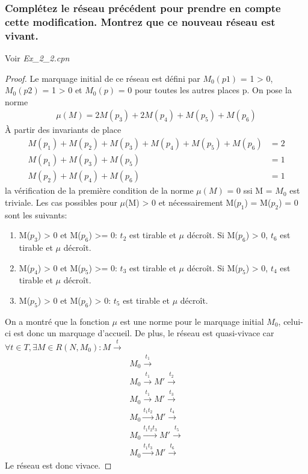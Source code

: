 \documentclass[french]{article}
\begin{document}
\subsubsection{Complétez le réseau précédent pour prendre en compte cette modification. Montrez que ce nouveau réseau est
  vivant.}
Voir \textit{Ex\_2\_2.cpn}
\begin{proof}
  Le marquage initial de ce réseau est défini par $M_0(p1)$ = 1 > 0, $M_0(p2)$ = 1 > 0 et $M_0(p)$ = 0 pour toutes les autres
  places p. On pose la norme
  \begin{align*}
    \mu(M) = 2M(p_3) + 2M(p_4) + M(p_5) + M(p_6)
  \end{align*}
  À partir des invariants de place
  \begin{align*}
    M(p_1) + M(p_2) + M(p_3) + M(p_4) + M(p_5) + M(p_6) &= 2 \\
    M(p_1) + M(p_3) + M(p_5) &= 1 \\
    M(p_2) + M(p_4) + M(p_6) &= 1
  \end{align*}
  la vérification de la première condition de la norme $\mu(M)$ = 0 ssi M = $M_0$ est triviale. Les cas possibles pour
  $\mu$(M) > 0 et nécessairement M($p_1$) = M($p_2$) = 0 sont les
  suivants:
  \begin{enumerate}
  \item M($p_3$) > 0 et M($p_6$) >= 0: $t_2$ est tirable et $\mu$ décroît. Si M($p_6$) > 0, $t_6$ est tirable et $\mu$ décroît.
  \item M($p_4$) > 0 et M($p_5$) >= 0: $t_3$ est tirable et $\mu$ décroît. Si M($p_5$) > 0, $t_4$ est tirable et $\mu$ décroît.
  \item M($p_5$) > 0 et M($p_6$) > 0: $t_5$ est tirable et $\mu$ décroît.
  \end{enumerate}
  On a montré que la fonction $\mu$ est une norme pour le marquage initial $M_0$, celui-ci est donc un marquage d'accueil. De
  plus, le réseau est quasi-vivace car $\forall t \in T, \exists M \in R(N, M_0): M \xrightarrow{t}$
  \begin{align*}
    M_0 \xrightarrow{t_1} \\
    M_0 \xrightarrow{t_1} M' \xrightarrow{t_2} \\
    M_0 \xrightarrow{t_1} M' \xrightarrow{t_3} \\
    M_0 \xrightarrow{t_1 t_2} M' \xrightarrow{t_4} \\
    M_0 \xrightarrow{t_1 t_2 t_3} M' \xrightarrow{t_5} \\
    M_0 \xrightarrow{t_1 t_3} M' \xrightarrow{t_6}
  \end{align*}
  Le réseau est donc vivace.
\end{proof}
\end{document}
